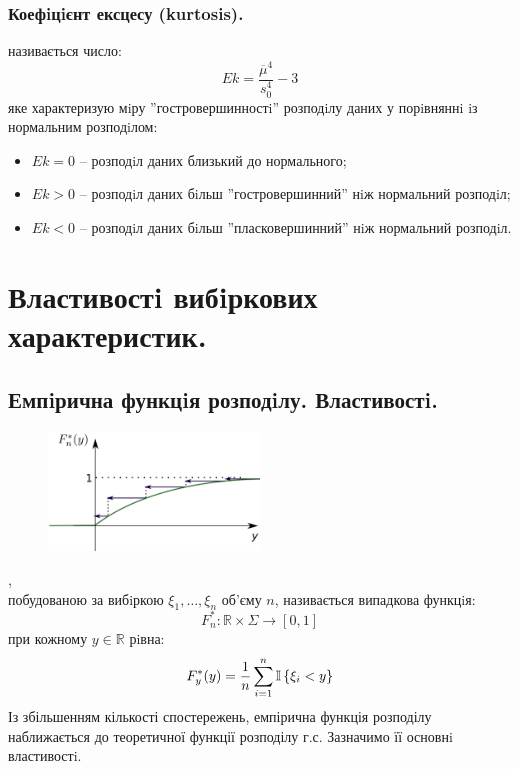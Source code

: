 \subsubsection{Коефiцiєнт ексцесу (kurtosis).}
 називається число:
$$
Ek = \frac{\overline{\mu}^4}{s_0^4} - 3
$$
яке характеризую мiру ''гостровершинностi'' розподiлу даних у порiвняннi iз нормальним
розподiлом:
\begin{itemize}
\item $Ek = 0$ – розподiл даних близький до нормального;
\item $Ek > 0$ – розподiл даних бiльш ”гостровершинний” нiж нормальний розподiл;
\item $Ek < 0$ – розподiл даних бiльш ”пласковершинний” нiж нормальний розподiл.
\end{itemize}
\section{Властивостi вибiркових характеристик.}
\subsection{Емпiрична функцiя розподiлу. Властивостi.}
\begin{figure}
\vspace*{-2em}
\centering
\includegraphics[width=0.5\textwidth]{assets/lectures_part_5-c8ce8645.png}
\end{figure}
, \\ побудованою за вибiркою $\xi_1, \dots , \xi_n$ об’єму $n$, називається випадкова
функцiя: \\$$F_n^* : \mathbb{R} \times \Sigma \to [0,1]$$ при кожному $y \in \mathbb{R}$ рiвна:
$$
F_y^* (y) = \frac{1}{n}  \sum\limits_{i = 1}^{ n}{ \mathbb{I} \left\lbrace \xi_i < y \right\rbrace}
$$
Із збільшенням кількості спостережень, емпірична функція розподілу наближається до теоретичної функції розподілу г.с. Зазначимо її основнi властивостi.

